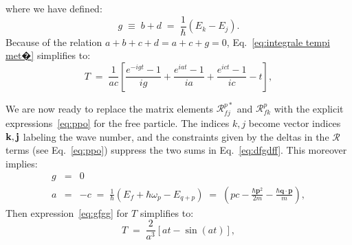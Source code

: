 \documentclass[12pt,onecolumn,amssymb,nofootinbib]{revtex4-2} %
\begin{document}
where we have defined:
\begin{equation} \label{eq:con2}
g \; \equiv \; b+d \; = \; \frac{1}{\hbar}\left(E_{k}-E_{j}\right).
\end{equation}
Because of the relation $a+b+c+d=a+c+g=0$, Eq.~\eqref{eq:integrale tempi met�}
simplifies to:
\begin{equation} \label{eq:gfgg}
T \; = \; \frac{1}{ac}\left[\frac{e^{-igt}-1}{ig}+\frac{e^{iat}-1}{ia}+\frac{e^{ict}-1}{ic}-t
\right],
\end{equation}

We are now ready to replace the matrix elements ${\mathcal R}_{fj}^{p*}$ and
${\mathcal R}_{fk}^{p}$ with the explicit expressions~\eqref{eq:ppo} for the
free particle. The indices $k, j$ become vector indices ${\bf k,j}$ labeling
the wave number, and the constraints given by the deltas in the ${\mathcal R}$
terms (see Eq.~\eqref{eq:ppo}) suppress the two sums in Eq.~\eqref{eq:dfgdff}.
This moreover implies:
\begin{eqnarray}
g & = & 0 \\
a & = & -c \; = \; \frac{1}{\hbar}\left(E_{f}+\hbar\omega_{p}-E_{q+p}\right) \; = \;
\left(pc-\frac{\hbar\mathbf{p}^{2}}{2m}-\frac{\hbar\mathbf{q\cdot p}}{m}\right), \label
{eq:ffou}
\end{eqnarray}
Then expression~\eqref{eq:gfgg} for $T$ simplifies to:
\begin{equation}
T \; = \; \frac{2}{a^{3}}\left[at-\sin\left(at\right)\right],
\end{equation}

\end{document}
